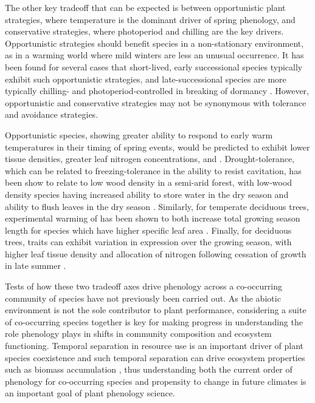 \documentclass[11pt]{article}
\begin{document}
The other key tradeoff that can be expected is between opportunistic plant strategies, where temperature is the dominant driver of spring phenology, and conservative strategies, where photoperiod and chilling are the key drivers. Opportunistic strategies should benefit species in a non-stationary environment, as in a warming world where mild winters are less an unusual occurrence. It has been found for several cases that short-lived, early successional species typically exhibit such opportunistic strategies, and late-successional species are more typically chilling- and photoperiod-controlled in breaking of dormancy \cite{Korner:2010}\cite{Basler:2012aa}\cite{Caffarra:2011ab}. However, opportunistic and conservative strategies may not be synonymous with tolerance and avoidance strategies. 

Opportunistic species, showing greater ability to respond to early warm temperatures in their timing of spring events, would be predicted to exhibit lower tissue densities, greater leaf nitrogen concentrations, and . Drought-tolerance, which can be related to freezing-tolerance in the ability to resist cavitation, has been show to relate to low wood density in a semi-arid forest, with low-wood density species having increased ability to store water in the dry season and ability to flush leaves in the dry season \cite{Lima:2010aa}. Similarly, for temperate deciduous trees, experimental warming of has been shown to both increase total growing season length for species which have higher specific leaf area \cite{XU:2009aa}. Finally, for deciduous trees, traits can exhibit variation in expression over the growing season, with higher leaf tissue density and allocation of nitrogen following cessation of growth in late summer \cite{McKown:2013aa}.


Tests of how these two tradeoff axes drive phenology across a co-occurring community of species have not previously been carried out. As the abiotic environment is not the sole contributor to plant performance, considering a suite of co-occurring species together is key for making progress in understanding the role phenology plays in shifts in community composition and ecosystem functioning. Temporal separation in resource use is an important driver of plant species coexistence \cite{Mason:2013aa} and such temporal separation can drive ecosystem properties such as biomass accumulation \cite{Sapijanskas:2014aa}, thus understanding both the current order of phenology for co-occurring species and propensity to change in future climates is an important goal of plant phenology science.
\end{document}
